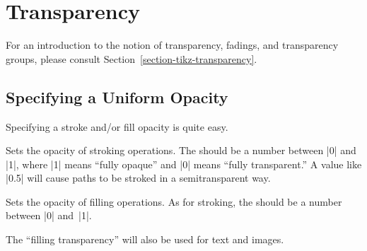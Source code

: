 %
%
%


\section{Transparency}

\label{section-transparency}


For an introduction to the notion of transparency, fadings, and
transparency groups, please consult Section~\ref{section-tikz-transparency}.


\subsection{Specifying a Uniform Opacity}

Specifying a stroke and/or fill opacity is quite easy.

\begin{command}{\pgfsetstrokeopacity{}}
  Sets the opacity of stroking operations. The  should be
  a number between |0| and |1|, where |1| means ``fully opaque'' and
  |0| means ``fully transparent.'' A value like |0.5| will cause paths
  to be stroked in a semitransparent way.

\begin{codeexample}[]
\begin{pgfpicture}
  \pgfsetlinewidth{5mm}
  \color{red}
  \pgfpathcircle{\pgfpoint{0cm}{0cm}}{10mm} 
  \color{black}
  \pgfpathcircle{\pgfpoint{1cm}{0cm}}{10mm} 
\end{pgfpicture}
\end{codeexample}
\end{command}


\begin{command}{\pgfsetfillopacity{}}
  Sets the opacity of filling operations. As for stroking, the
   should be a number between |0| and~|1|.

  The ``filling transparency'' will also be used for text and images.

\begin{codeexample}[]
\end{codeexample}
\end{command}

